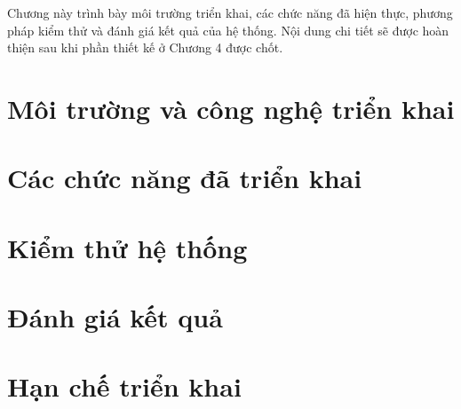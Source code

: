 
Chương này trình bày môi trường triển khai, các chức năng đã hiện thực, phương pháp kiểm thử và đánh giá kết quả của hệ thống. Nội dung chi tiết sẽ được hoàn thiện sau khi phần thiết kế ở Chương 4 được chốt.

\section{Môi trường và công nghệ triển khai}



\section{Các chức năng đã triển khai}


\section{Kiểm thử hệ thống}


\section{Đánh giá kết quả}


\section{Hạn chế triển khai}

